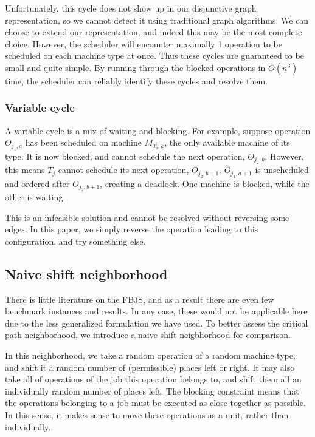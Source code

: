 \documentclass[a4paper,11pt]{article}
\begin{document}
Unfortunately, this cycle does not show up in our disjunctive graph representation, so we cannot detect it using traditional graph algorithms. We can choose to extend our representation, and indeed this may be the most complete choice. However, the scheduler will encounter maximally 1 operation to be scheduled on each machine type at once. Thus these cycles are guaranteed to be small and quite simple. By running through the blocked operations in $O(n^3)$ time, the scheduler can reliably identify these cycles and resolve them.

\subsubsection{Variable cycle}

A variable cycle is a mix of waiting and blocking. For example, suppose operation $O_{j_1,a}$ has been scheduled on machine $M_{T_i, k}$, the only available machine of its type. It is now blocked, and cannot schedule the next operation, $O_{j_2,b}$. However, this means $T_j$ cannot schedule its next operation, $O_{j_2,b + 1}$. $O_{j_1,a + 1}$ is unscheduled and ordered after $O_{j_2,b + 1}$, creating a deadlock. One machine is blocked, while the other is waiting.

This is an infeasible solution and cannot be resolved without reversing some edges. In this paper, we simply reverse the operation leading to this configuration, and try something else.

\subsection{Naive shift neighborhood}

There is little literature on the FBJS, and as a result there are even few benchmark instances and results. In any case, these would not be applicable here due to the less generalized formulation we have used. To better assess the critical path neighborhood, we introduce a naive shift neigbhorhood for comparison.

In this neighborhood, we take a random operation of a random machine type, and shift it a random number of (permissible) places left or right. It may also take all of operations of the job this operation belongs to, and shift them all an individually random number of places left. The blocking constraint means that the operations belonging to a job must be executed as close together as possible. In this sense, it makes sense to move these operations as a unit, rather than individually.
\end{document}
